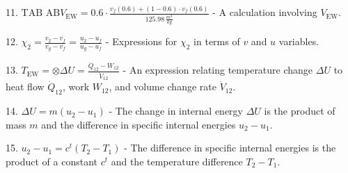 11. \( \text{TAB AB} V_{\text{EW}} = 0.6 \cdot \frac{v_f(0.6) + (1-0.6) \cdot v_f(0.6)}{125.98 \, \frac{m^3}{kg}} \) - A calculation involving \( V_{\text{EW}} \).

12. \( \chi_2 = \frac{v_2 - v_f}{v_g - v_f} = \frac{u_2 - u_f}{u_g - u_f} \) - Expressions for \( \chi_2 \) in terms of \( v \) and \( u \) variables.

13. \( T_{\text{EW}} = \otimes \Delta U = \frac{\dot{Q}_{12} - W_{12}}{\dot{V}_{12}} \) - An expression relating temperature change \( \Delta U \) to heat flow \( \dot{Q}_{12} \), work \( W_{12} \), and volume change rate \( \dot{V}_{12} \).

14. \( \Delta U = m(u_2 - u_1) \) - The change in internal energy \( \Delta U \) is the product of mass \( m \) and the difference in specific internal energies \( u_2 - u_1 \).

15. \( u_2 - u_1 = c^t(T_2 - T_1) \) - The difference in specific internal energies is the product of a constant \( c^t \) and the temperature difference \( T_2 - T_1 \).
